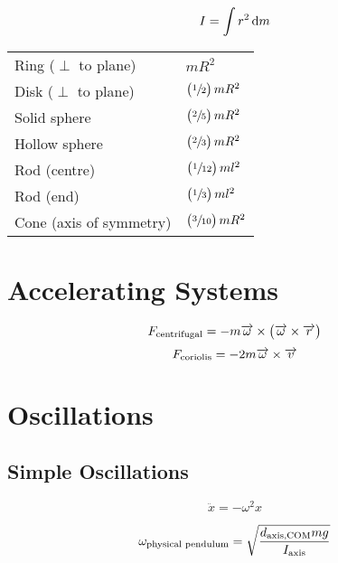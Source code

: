 \documentclass[fleqn, a5paper]{amsart}
\theoremstyle{definition}
\theoremstyle{theorem}
\begin{document}
\begin{equation*}
	I = \int r^2 \dif m
\end{equation*}

\begin{tabular}{l l}
	Ring ($\perp$ to plane) & $m R^2$\\
	Disk ($\perp$ to plane) & $\left( \sfrac{1}{2} \right) m R^2$\\
	Solid sphere & $\left( \sfrac{2}{5} \right) m R^2$\\
	Hollow sphere & $\left( \sfrac{2}{3} \right) m R^2$\\
	Rod (centre) & $\left( \sfrac{1}{12} \right) m l^2$\\
	Rod (end) & $\left( \sfrac{1}{3} \right) m l^2$\\
	Cone (axis of symmetry) & $\left( \sfrac{3}{10} \right) m R^2$\\
\end{tabular}

\section{Accelerating Systems}

\begin{equation*}
	F_{\textnormal{centrifugal}} = - m \overrightarrow{\omega} \times \left( \overrightarrow{\omega} \times \overrightarrow{r} \right)
\end{equation*}
\begin{equation*}
	F_{\textnormal{coriolis}} = - 2 m \overrightarrow{\omega} \times \overrightarrow{v}
\end{equation*}

\section{Oscillations}

\subsection{Simple Oscillations}

\begin{equation*}
	\ddot{x} = - \omega^2 x
\end{equation*}

\begin{equation*}
	\omega_{\textnormal{physical pendulum}} = \sqrt{\dfrac{d_{\textnormal{axis,COM}} m g}{I_{\textnormal{axis}}}}
\end{equation*}
\end{document}
